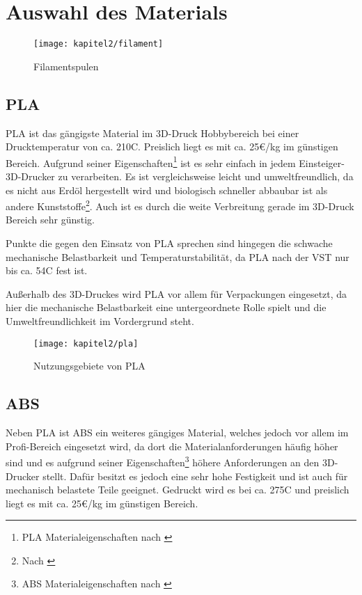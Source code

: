 \chapter{Auswahl des Materials}

\begin{figure}[h]
  \centering
  \texttt{[image: kapitel2/filament]}
  \caption{Filamentspulen}
  \label{Kap2:Filament}
\end{figure}

\section{PLA}
\ac{PLA} ist das gängigste Material im 3D-Druck Hobbybereich bei einer Drucktemperatur von ca. 210\degree C. Preislich liegt es mit ca. 25€/kg im günstigen Bereich. Aufgrund seiner Eigenschaften\footnote{PLA Materialeigenschaften nach \cite{ULABS2017}} ist es sehr einfach in jedem Einsteiger-3D-Drucker zu verarbeiten. Es ist vergleichsweise leicht und umweltfreundlich, da es nicht aus Erdöl hergestellt wird und biologisch schneller abbaubar ist als andere Kunststoffe\footnote{Nach \cite{Tokiwa2009}}. Auch ist es durch die weite Verbreitung gerade im 3D-Druck Bereich sehr günstig.

Punkte die gegen den Einsatz von \ac{PLA} sprechen sind hingegen die schwache mechanische Belastbarkeit und Temperaturstabilität, da \ac{PLA} nach der \ac{VST} nur bis ca. 54\degree C fest ist.

Außerhalb des 3D-Druckes wird \ac{PLA} vor allem für Verpackungen eingesetzt, da hier die mechanische Belastbarkeit eine untergeordnete Rolle spielt und die Umweltfreundlichkeit im Vordergrund steht.

\begin{figure}[h]
  \centering
  \texttt{[image: kapitel2/pla]}
  \caption{Nutzungsgebiete von PLA}
  \label{Kap2:PLAEinsatz}
\end{figure}

\section{ABS}
Neben \ac{PLA} ist \ac{ABS} ein weiteres gängiges Material, welches jedoch vor allem im Profi-Bereich eingesetzt wird, da dort die Materialanforderungen häufig höher sind und es aufgrund seiner Eigenschaften\footnote{ABS Materialeigenschaften nach \cite{ULPLA2017}} höhere Anforderungen an den 3D-Drucker stellt. Dafür besitzt es jedoch eine sehr hohe Festigkeit und ist auch für mechanisch belastete Teile geeignet. Gedruckt wird es bei ca. 275\degree C und preislich liegt es mit ca. 25€/kg im günstigen Bereich.


